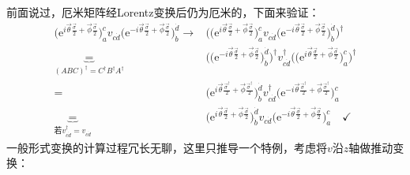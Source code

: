 前面说过，厄米矩阵经Lorentz变换后仍为厄米的，下面来验证：
\begin{align}
	\Big( \mathrm{e}^{ i \vec{\theta} \frac{ \vec{\sigma} }{2}  + \vec{\phi} \frac{\vec{\sigma}}{2}}  \Big)^c_a v_{c \dot{d}} \Big( \mathrm{e}^{ -i \vec{\theta} \frac{ \vec{\sigma} }{2}  + \vec{\phi} \frac{\vec{\sigma}}{2}}  \Big)^{\dot{d}}_{\dot{b}}  \rightarrow& \Bigg( \Big( \mathrm{e}^{ i \vec{\theta} \frac{ \vec{\sigma} }{2}  + \vec{\phi} \frac{\vec{\sigma}}{2}}  \Big)^c_a v_{c \dot{d}} \Big( \mathrm{e}^{ -i \vec{\theta} \frac{ \vec{\sigma} }{2}  + \vec{\phi} \frac{\vec{\sigma}}{2}}  \Big)^{\dot{d}}_{\dot{b}} \Bigg)^\dag \nonumber \\
	\underbrace{=}_{(ABC)^\dag = C^\dag B^\dag A^\dag}& \bigg(  \Big( \mathrm{e}^{ -i \vec{\theta} \frac{ \vec{\sigma} }{2}  + \vec{\phi} \frac{\vec{\sigma}}{2}}  \Big)^{\dot{d}}_{\dot{b}}   \bigg)^\dag v^\dag_{c \dot{d}}  \bigg( \Big( \mathrm{e}^{ i \vec{\theta} \frac{ \vec{\sigma} }{2}  + \vec{\phi} \frac{\vec{\sigma}}{2}}  \Big)^c_a \bigg)^\dag \nonumber \\
	=& \bigg( \mathrm{e}^{ i \vec{\theta} \frac{ \vec{\sigma}^\dag }{2}  + \vec{\phi} \frac{\vec{\sigma}^\dag}{2}} \bigg)^{\dot{d}}_{\dot{b}} v^\dag_{c \dot{d}} \bigg(  \mathrm{e}^{ -i \vec{\theta} \frac{ \vec{\sigma}^\dag }{2}  + \vec{\phi} \frac{\vec{\sigma}^\dag}{2}}\bigg)^c_a \nonumber \\
\label{equ3.218}
	\underbrace{=}_{\text{若} v^\dag_{c \dot{d}} = v_{c \dot{d}}}& \bigg( \mathrm{e}^{ i \vec{\theta} \frac{ \vec{\sigma} }{2}  + \vec{\phi} \frac{\vec{\sigma}}{2}} \bigg)^{\dot{d}}_{\dot{b}} v_{c \dot{d}} \bigg(  \mathrm{e}^{ -i \vec{\theta} \frac{ \vec{\sigma} }{2}  + \vec{\phi} \frac{\vec{\sigma}}{2}}\bigg)^c_a \quad \checkmark
\end{align}
一般形式变换的计算过程冗长无聊，这里只推导一个特例，考虑将$v$沿$z$轴做推动变换：
